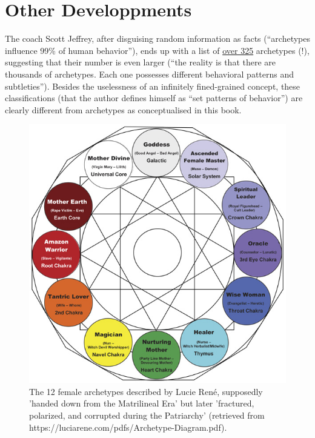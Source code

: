 \documentclass[
]{book}
\begin{document}
\hypertarget{other-developpments}{%
\section{Other Developpments}\label{other-developpments}}

The coach Scott Jeffrey, after disguising random information as facts (``archetypes influence 99\% of human behavior''), ends up with a list of \href{https://scottjeffrey.com/archetypes-list/}{over 325} archetypes (!), suggesting that their number is even larger (``the reality is that there are thousands of archetypes. Each one possesses different behavioral patterns and subtleties''). Besides the uselessness of an infinitely fined-grained concept, these classifications (that the author defines himself as ``set patterns of behavior'') are clearly different from archetypes as conceptualised in this book.

\begin{figure}

{\centering \includegraphics[width=\textwidth]{img/female_archetypes} 

}

\caption{The 12 female archetypes described by Lucie René, supposedly 'handed down from the Matrilineal Era' but later 'fractured, polarized, and corrupted during the Patriarchy' (retrieved from https://luciarene.com/pdfs/Archetype-Diagram.pdf).}\label{fig:unnamed-chunk-11}
\end{figure}
\end{document}
